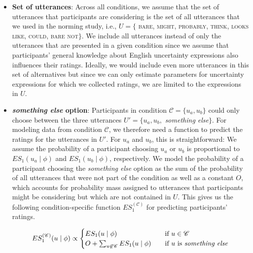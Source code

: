 \documentclass[lucida,biblatex]{sp} %
\begin{document}
\begin{itemize}
\item \textbf{Set of utterances}: Across all conditions, we assume that the set of utterances that participants are considering is the set of all utterances that we used in the norming study, i.e., $U= \{$ \textsc{bare}, \textsc{might}, \textsc{probably}, \textsc{think}, \textsc{looks like}, \textsc{could}, \textsc{bare not}$\}$. We include all utterances instead of only the utterances that are presented in a given condition since we assume that participants' general knowledge about English uncertainty expressions also influences their ratings. Ideally, we would include even more utterances in this set of alternatives but since we can only estimate parameters for uncertainty expressions for which we collected ratings, we are limited to the expressions in $U$.

\item \textbf{\textit{something else} option}: Participants in condition $\mathscr{C} = \{u_a, u_b\}$ 
could only choose between the three utterances $U' = \{u_a, u_b,$ \textit{something else}$\}$.
For modeling data from condition $\mathscr{C}$, we therefore need a function to predict the ratings 
for the utterances in $U'$. For $u_a$ and $u_b$, this is straightforward: We assume the probability 
of a participant choosing $u_a$ or $u_b$
is proportional to $ES_1(u_a \mid \phi)$ and $ES_1(u_b \mid \phi)$, respectively. 
We model the probability of a participant choosing the \textit{something else} option as the sum 
of the probability of all utterances that were not part of the condition as well as a constant $O$, 
which accounts for probability mass assigned to utterances that participants might be 
considering but which are not contained in $U$. This gives us the following condition-specific 
function $ES_1^{(\mathscr{C})}$ for predicting participants' ratings.

$$
ES_1^{(\mathscr{C})}(u \mid \phi) \propto 
     \begin{cases}
       ES_1(u \mid \phi) &\quad\text{if } u  \in \mathscr{C}\\
       O + \sum_{u \not \in \mathscr{C}} ES_1(u \mid \phi) &\quad \mbox{if $u$ is \textit{something else}} \\
     \end{cases}
$$


\end{itemize}
\end{document}
